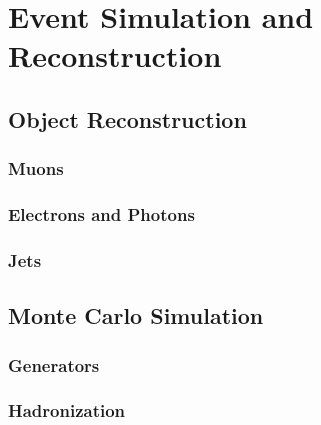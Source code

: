 \chapter{
  Event Simulation and Reconstruction
 }\label{ch_reco}

\section{
  Object Reconstruction
 }

\subsection{
  Muons
}

\subsection{
  Electrons and Photons
}

\subsection{
  Jets
}

\section{
  Monte Carlo Simulation
 }\label{ch_reco:mc}

\subsection{
  Generators
}

\subsection{
  Hadronization
}
